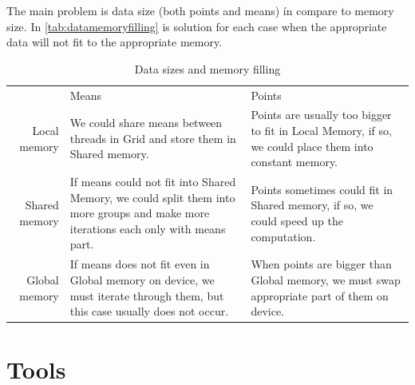 The main problem is data size (both points and means) ín compare to memory size. In \autoref{tab:datamemoryfilling} is solution for each case when the appropriate data will not fit to the appropriate memory.

\def\tabularxcolumn#1{m{#1}}
\begin{table}[h]
\centering
\caption{Data sizes and memory filling}
\label{tab:datamemoryfilling}
\begin{tabularx}{\textwidth}{|r|Y|Y|}
&Means&Points\\ 
{} Local memory&We could  share means between threads in Grid and store them in Shared memory.& Points are usually too bigger to fit in Local Memory, if so, we could place them into constant memory.\\ 
{} Shared memory&If means could not fit into Shared Memory, we could split them into more groups and make more iterations each only with means part.&Points sometimes could fit in Shared memory, if so, we could speed up the computation.\\ 
{} Global memory&If means does not fit even in Global memory on device, we must iterate through them, but this case usually does not occur.& When points are bigger than Global memory, we must swap appropriate part of them on device.\\ 
\end{tabularx}
\end{table}
\section{Tools}